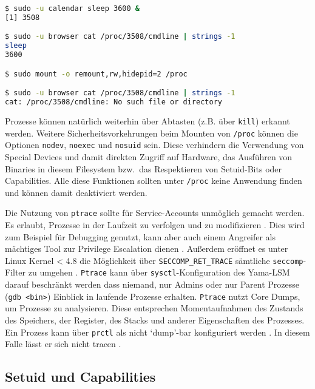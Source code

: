 \begin{lstlisting}[language=bash]
$ sudo -u calendar sleep 3600 &
[1] 3508

$ sudo -u browser cat /proc/3508/cmdline | strings -1
sleep
3600

$ sudo mount -o remount,rw,hidepid=2 /proc

$ sudo -u browser cat /proc/3508/cmdline | strings -1
cat: /proc/3508/cmdline: No such file or directory
\end{lstlisting}

Prozesse können natürlich weiterhin über Abtasten (z.B. über \texttt{kill}) erkannt werden. Weitere Sicherheitsvorkehrungen beim Mounten von \texttt{/proc} können die Optionen \texttt{nodev}, \texttt{noexec} und \texttt{nosuid} sein. Diese verhindern die Verwendung von Special Devices und damit direkten Zugriff auf Hardware, das Ausführen von Binaries in diesem Filesystem bzw.\ das Respektieren von Setuid-Bits oder Capabilities. Alle diese Funktionen sollten unter \texttt{/proc} keine Anwendung finden und können damit deaktiviert werden.

Die Nutzung von \texttt{ptrace} sollte für Service-Accounts unmöglich gemacht werden. Es erlaubt, Prozesse in der Laufzeit zu verfolgen und zu modifizieren \cite{man-ptrace}. Dies wird zum Beispiel für Debugging genutzt, kann aber auch einem Angreifer als mächtiges Tool zur Privilege Escalation dienen \cite{attack-process-injection}.
Außerdem eröffnet es unter Linux Kernel < 4.8 die Möglichkeit über \texttt{SECCOMP\_RET\_TRACE} sämtliche \texttt{seccomp}-Filter zu umgehen \cite{ptrace-seccomp-bypass}.
\texttt{Ptrace} kann über \texttt{sysctl}-Konfiguration des Yama-LSM darauf beschränkt werden dass niemand, nur Admins oder nur Parent Prozesse (\texttt{gdb <bin>}) Einblick in laufende Prozesse erhalten. \texttt{Ptrace} nutzt Core Dumps, um Prozesse zu analysieren. Diese entsprechen Momentaufnahmen des Zustands des Speichers, der Register, des Stacks und anderer Eigenschaften des Prozesses. Ein Prozess kann über \texttt{prctl} als nicht `dump'-bar konfiguriert werden \cite{man-proc}. In diesem
Falle lässt er sich nicht tracen \cite{man-ptrace}.


\subsection{Setuid und Capabilities}

